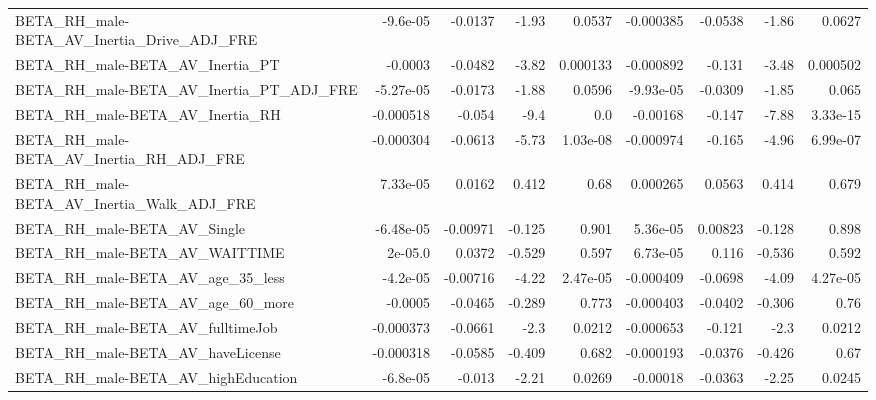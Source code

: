 \begin{tabular}{lrrrrrrrr}
BETA\_RH\_male-BETA\_AV\_Inertia\_Drive\_ADJ\_FRE         &    -9.6e-05 &      -0.0137 &    -1.93 &   0.0537 &  -0.000385 &     -0.0538 &        -1.86 &        0.0627 \\
BETA\_RH\_male-BETA\_AV\_Inertia\_PT                    &     -0.0003 &      -0.0482 &    -3.82 & 0.000133 &  -0.000892 &      -0.131 &        -3.48 &      0.000502 \\
BETA\_RH\_male-BETA\_AV\_Inertia\_PT\_ADJ\_FRE            &   -5.27e-05 &      -0.0173 &    -1.88 &   0.0596 &  -9.93e-05 &     -0.0309 &        -1.85 &         0.065 \\
BETA\_RH\_male-BETA\_AV\_Inertia\_RH                    &   -0.000518 &       -0.054 &     -9.4 &      0.0 &   -0.00168 &      -0.147 &        -7.88 &      3.33e-15 \\
BETA\_RH\_male-BETA\_AV\_Inertia\_RH\_ADJ\_FRE            &   -0.000304 &      -0.0613 &    -5.73 & 1.03e-08 &  -0.000974 &      -0.165 &        -4.96 &      6.99e-07 \\
BETA\_RH\_male-BETA\_AV\_Inertia\_Walk\_ADJ\_FRE          &    7.33e-05 &       0.0162 &    0.412 &     0.68 &   0.000265 &      0.0563 &        0.414 &         0.679 \\
BETA\_RH\_male-BETA\_AV\_Single                        &   -6.48e-05 &     -0.00971 &   -0.125 &    0.901 &   5.36e-05 &     0.00823 &       -0.128 &         0.898 \\
BETA\_RH\_male-BETA\_AV\_WAITTIME                      &     2e-05.0 &       0.0372 &   -0.529 &    0.597 &   6.73e-05 &       0.116 &       -0.536 &         0.592 \\
BETA\_RH\_male-BETA\_AV\_age\_35\_less                   &    -4.2e-05 &     -0.00716 &    -4.22 & 2.47e-05 &  -0.000409 &     -0.0698 &        -4.09 &      4.27e-05 \\
BETA\_RH\_male-BETA\_AV\_age\_60\_more                   &     -0.0005 &      -0.0465 &   -0.289 &    0.773 &  -0.000403 &     -0.0402 &       -0.306 &          0.76 \\
BETA\_RH\_male-BETA\_AV\_fulltimeJob                   &   -0.000373 &      -0.0661 &     -2.3 &   0.0212 &  -0.000653 &      -0.121 &         -2.3 &        0.0212 \\
BETA\_RH\_male-BETA\_AV\_haveLicense                   &   -0.000318 &      -0.0585 &   -0.409 &    0.682 &  -0.000193 &     -0.0376 &       -0.426 &          0.67 \\
BETA\_RH\_male-BETA\_AV\_highEducation                 &    -6.8e-05 &       -0.013 &    -2.21 &   0.0269 &   -0.00018 &     -0.0363 &        -2.25 &        0.0245 \\

\end{tabular}
